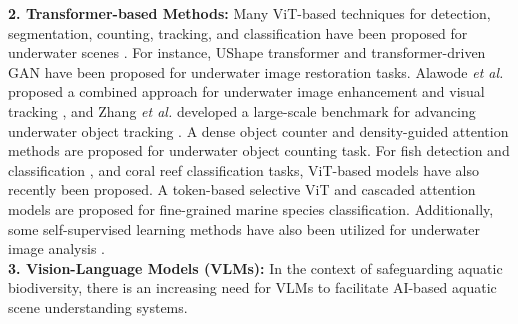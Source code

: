 \noindent \textbf{2. Transformer-based Methods:} Many ViT-based techniques for detection, segmentation, counting, tracking, and classification have been proposed for underwater scenes \cite{peng2023u, zhang2024webuot, sun2023indiscernible, yang2024density, ai2024novel}.
For instance, UShape transformer \cite{peng2023u} and transformer-driven GAN \cite{ummar2023window} have been proposed for underwater image restoration tasks.
Alawode \textit{et al.} proposed a combined approach for underwater image enhancement and visual tracking \cite{alawode2022utb180}, and Zhang \textit{et al.}  developed a large-scale benchmark for advancing underwater object tracking \cite{zhang2024webuot}.
A dense object counter \cite{sun2023indiscernible} and density-guided attention \cite{yang2024density} methods are proposed for underwater object counting task.
For fish detection and classification \cite{liu2024dp, liu2024cffi}, and coral reef classification \cite{ai2024novel, shao2024deep} tasks, ViT-based models have also recently been proposed. 
A token-based selective ViT \cite{si2023token} and cascaded attention \cite{zhang2024catnet} models are proposed for fine-grained marine species classification.
Additionally, some self-supervised learning methods have also been utilized for underwater image analysis \cite{huang2023contrastive, saleh2022transformer}.\\
\noindent \textbf{3. Vision-Language Models (VLMs):} In the context of safeguarding aquatic biodiversity, there is an increasing need for VLMs to facilitate AI-based aquatic scene understanding systems. 
